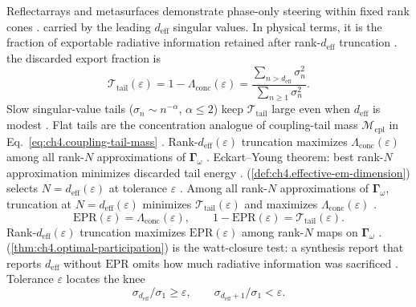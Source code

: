 Reflectarrays and metasurfaces demonstrate phase-only steering within fixed rank cones \cite{harrington2001}.
carried by the leading \(d_{\mathrm{eff}}\) singular values. In physical terms, it is the fraction of exportable radiative information retained after rank-\(d_{\mathrm{eff}}\)
truncation \cite{devaney2004}.
the discarded export fraction is
\begin{equation}
\label{eq:ch4.tail-discard}
\mathcal{T}_{\mathrm{tail}}(\varepsilon)=1-\Lambda_{\mathrm{conc}}(\varepsilon)=\frac{\sum_{n>d_{\mathrm{eff}}}\sigma_{n}^{2}}{\sum_{n\ge1}\sigma_{n}^{2}}.
\end{equation}
Slow singular-value tails (\(\sigma_{n}\sim n^{-\alpha}\), \(\alpha\le2\)) keep \(\mathcal{T}_{\mathrm{tail}}\) large even when \(d_{\mathrm{eff}}\) is modest
\cite{devaney2004}. Flat tails are the concentration analogue of coupling-tail mass
\(\mathcal{M}_{\mathrm{cpl}}\) in Eq.~\eqref{eq:ch4.coupling-tail-mass} \cite{stratton1941}.
\label{prop:ch4.truncation-concentration}
Rank-\(d_{\mathrm{eff}}(\varepsilon)\) truncation maximizes \(\Lambda_{\mathrm{conc}}(\varepsilon)\) among all rank-\(N\) approximations of
\(\boldsymbol{\Gamma}_\omega\) \cite{harrington2001}.
Eckart--Young theorem: best rank-\(N\) approximation minimizes discarded tail energy \cite{harrington2001}. (\ref{def:ch4.effective-em-dimension})
selects \(N=d_{\mathrm{eff}}(\varepsilon)\) at tolerance \(\varepsilon\) \cite{stratton1941}.
\label{thm:ch4.eckart-young-conc}
Among all rank-\(N\) approximations of \(\boldsymbol{\Gamma}_\omega\), truncation at \(N=d_{\mathrm{eff}}(\varepsilon)\) minimizes
\(\mathcal{T}_{\mathrm{tail}}(\varepsilon)\) and maximizes \(\Lambda_{\mathrm{conc}}(\varepsilon)\) \cite{harrington2001}.
\begin{equation}
\label{eq:ch4.export-participation}
\mathrm{EPR}(\varepsilon)=\Lambda_{\mathrm{conc}}(\varepsilon),\qquad 1-\mathrm{EPR}(\varepsilon)=\mathcal{T}_{\mathrm{tail}}(\varepsilon).
\end{equation}
\label{thm:ch4.optimal-participation}
Rank-\(d_{\mathrm{eff}}(\varepsilon)\) truncation maximizes \(\mathrm{EPR}(\varepsilon)\) among rank-\(N\) maps on \(\boldsymbol{\Gamma}_\omega\)
\cite{harrington2001}.
(\ref{thm:ch4.optimal-participation}) is the watt-closure test: a synthesis report that reports \(d_{\mathrm{eff}}\) without
\(\mathrm{EPR}\) omits how much radiative information was sacrificed \cite{hansen1988}.
Tolerance \(\varepsilon\) locates the knee
\begin{equation}
\label{eq:ch4.sv-knee}
\sigma_{d_{\mathrm{eff}}}/\sigma_{1}\ge\varepsilon,\qquad \sigma_{d_{\mathrm{eff}}+1}/\sigma_{1}<\varepsilon.
\end{equation}
